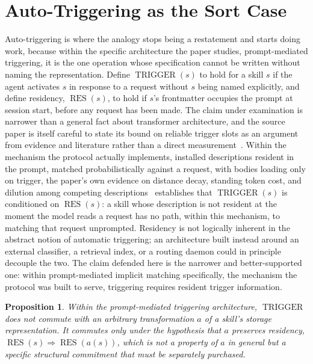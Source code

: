 \documentclass[11pt]{article}
\newtheorem{proposition}{Proposition}
\begin{document}
\section{Auto-Triggering as the Sort Case}
\label{sec:sort-case}

Auto-triggering is where the analogy stops being a restatement and starts doing work, because within the specific architecture the paper studies, prompt-mediated triggering, it is the one operation whose specification cannot be written without naming the representation. Define $\operatorname{TRIGGER}(s)$ to hold for a skill $s$ if the agent activates $s$ in response to a request without $s$ being named explicitly, and define residency, $\operatorname{RES}(s)$, to hold if $s$'s frontmatter occupies the prompt at session start, before any request has been made. The claim under examination is narrower than a general fact about transformer architecture, and the source paper is itself careful to state its bound on reliable trigger slots as an argument from evidence and literature rather than a direct measurement~\cite{skills2026}. Within the mechanism the protocol actually implements, installed descriptions resident in the prompt, matched probabilistically against a request, with bodies loading only on trigger, the paper's own evidence on distance decay, standing token cost, and dilution among competing descriptions~\cite{liu2024lost,laban2025lost,jaroslawicz2025instructions} establishes that $\operatorname{TRIGGER}(s)$ is conditioned on $\operatorname{RES}(s)$: a skill whose description is not resident at the moment the model reads a request has no path, within this mechanism, to matching that request unprompted. Residency is not logically inherent in the abstract notion of automatic triggering; an architecture built instead around an external classifier, a retrieval index, or a routing daemon could in principle decouple the two. The claim defended here is the narrower and better-supported one: within prompt-mediated implicit matching specifically, the mechanism the protocol was built to serve, triggering requires resident trigger information.

\begin{proposition}
Within the prompt-mediated triggering architecture, $\operatorname{TRIGGER}$ does not commute with an arbitrary transformation $a$ of a skill's storage representation. It commutes only under the hypothesis that $a$ preserves residency, $\operatorname{RES}(s) \Rightarrow \operatorname{RES}(a(s))$, which is not a property of $a$ in general but a specific structural commitment that must be separately purchased.
\end{proposition}
\end{document}
